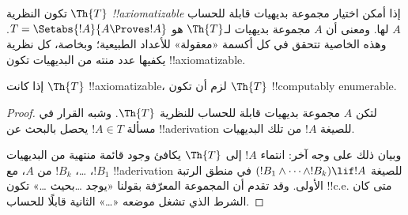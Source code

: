 \documentclass[../../../include/open-logic-section]{subfiles}
\begin{document}


تكون النظرية $\Th{T}$ \emph{!!{axiomatizable}} إذا أمكن اختيار
مجموعة بديهيات قابلة للحساب $A$ لها. ومعنى أن $A$ مجموعة بديهيات
لـ$\Th{T}$ هو $T=\Setabs{!A}{A\Proves !A}$. وهذه الخاصية تتحقق في
كل أكسمة «معقولة» للأعداد الطبيعية؛ وبخاصة، كل نظرية يكفيها عدد
منته من البديهيات تكون !!{axiomatizable}.

\begin{lem}
إذا كانت $\Th{T}$ !!{axiomatizable}، لزم أن تكون $\Th{T}$
!!{computably
enumerable}.
\end{lem}

\begin{proof}
لتكن $A$ مجموعة بديهيات قابلة للحساب للنظرية $\Th{T}$. وشبه القرار
في مسألة $!A\in T$ يحصل بالبحث عن !!a{derivation} للصيغة $!A$
من تلك البديهيات.

وبيان ذلك على وجه آخر: انتماء $!A$ إلى $\Th{T}$ يكافئ وجود قائمة
منتهية من البديهيات $!B_1$، \dots، $!B_k$ من $A$، مع
!!a{derivation} للصيغة
$(!B_1\land\dots\land !B_k)\lif !A$ في منطق الرتبة الأولى.
وقد تقدم أن المجموعة المعرّفة بقولنا «يوجد \dots بحيث \dots»
تكون !!{c.e.} متى كان الشرط الذي تشغل موضعه «\dots» الثانية قابلًا
للحساب.
\end{proof}
\end{document}
